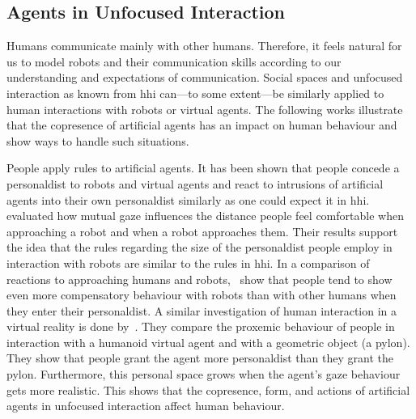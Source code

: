 \subsection{Agents in Unfocused Interaction}\label{sec.rw.hi.unfocused-rw}

Humans communicate mainly with other humans.
Therefore, it feels natural for us to model \glspl{robot} and their communication skills according to our understanding and expectations of communication.
Social spaces and \gls{unfocused interaction} as known from \acrfull{hhi} can---to some extent---be similarly applied to human interactions with \glspl{robot} or \glspl{virtual agent}. 
The following works illustrate that the \gls{copresence} of \glspl{artificial agent} has an impact on human behaviour and show ways to handle such situations.

People apply  rules to \glspl{artificial agent}.
It has been shown that people concede a \gls{personaldist} to \glspl{robot} and \glspl{virtual agent} and react to intrusions of \glspl{artificial agent} into their own \gls{personaldist} similarly as one could expect it in \gls{hhi}.
 evaluated how mutual gaze influences the distance people feel comfortable when approaching a \gls{robot} and when a \gls{robot} approaches them.
Their results support the idea that the  rules regarding the size of the \gls{personaldist} people employ in interaction with \glspl{robot} are similar to the rules in \gls{hhi}.
In a comparison of reactions to approaching humans and \glspl{robot},~ show that people tend to show even more compensatory behaviour with \glspl{robot} than with other humans when they enter their \gls{personaldist}.
A similar investigation of human interaction in a virtual reality is done by~.
They compare the proxemic behaviour of people in interaction with a humanoid \gls{virtual agent} and with a geometric object (a pylon).
They show that people grant the agent more \gls{personaldist} than they grant the pylon.
Furthermore, this personal space grows when the agent's gaze behaviour gets more realistic.
This shows that the \gls{copresence}, form, and actions of \glspl{artificial agent} in \gls{unfocused interaction} affect human behaviour.


